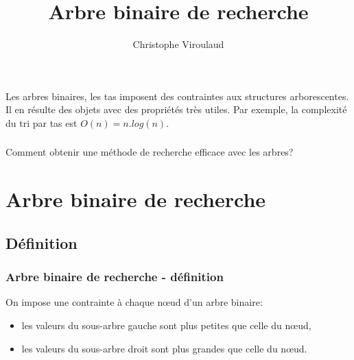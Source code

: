 \documentclass[svgnames,11pt]{beamer}
\author[]{Christophe Viroulaud}
\title{Arbre binaire de recherche}
\date{\framebox{\textbf{Algo 10}}}
\institute{Terminale - NSI}
\begin{document}
\begin{frame}
    \titlepage
\end{frame}
\begin{frame}
    \frametitle{}
    Les arbres binaires, les tas imposent des contraintes aux structures arborescentes. Il en résulte des objets avec des propriétés très utiles. Par exemple, la complexité du tri par tas est $O(n) = n.log(n)$.


\end{frame}
\begin{frame}
    \frametitle{}

    \begin{framed}
        \centering Comment obtenir une méthode de recherche efficace avec les arbres?
    \end{framed}

\end{frame}
\section{Arbre binaire de recherche}
\subsection{Définition}
\begin{frame}
    \frametitle{Arbre binaire de recherche - définition}

    On impose une contrainte à chaque nœud d'un arbre binaire:
    \begin{itemize}
        \item les valeurs du sous-arbre gauche sont plus petites que celle du nœud,
        \item les valeurs du sous-arbre droit sont plus grandes que celle du nœud.
    \end{itemize}
\end{frame}
\end{document}
